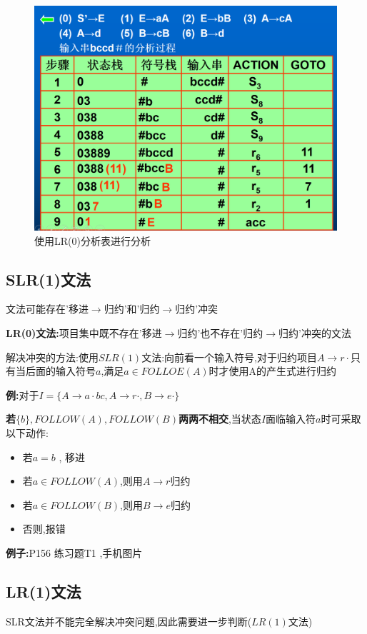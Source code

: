 \documentclass[UTF8,a4paper]{ctexart}
\newcommand{\spaceline}{\vspace{\baselineskip}}
\begin{document}
 \begin{figure}[H]
  \centering
  \includegraphics[scale = 0.3]{assets/CompilerConstructionPrinciples_a04e8.png}
  \caption{使用LR(0)分析表进行分析}
 \end{figure}

 \subsection{SLR(1)文法}
 文法可能存在'移进$\to$归约'和'归约$\to$归约'冲突

 \textbf{LR(0)文法:}项目集中既不存在'移进$\to$归约'也不存在'归约$\to$归约'冲突的文法

 \spaceline
 解决冲突的方法:使用$SLR(1)$文法:向前看一个输入符号,对于归约项目$A\to r \cdot$只有当后面的输入符号$a$,满足$a \in FOLLOE(A)$时才使用A的产生式进行归约

 \textbf{例:}对于$I = \{A\to a\cdot bc , A\to r \cdot , B\to e\cdot \}$

 \textbf{若$\{b\},FOLLOW(A) , FOLLOW(B)$两两不相交},当状态$I$面临输入符$a$时可采取以下动作:
 \begin{itemize}
  \item 若$a = b$ , 移进
  \item 若$a\in FOLLOW(A)$,则用$A\to r$归约
  \item 若$a\in FOLLOW(B)$,则用$B\to e$归约
  \item 否则,报错
 \end{itemize}

 \spaceline
 \textbf{例子:}P156 练习题T1 ,手机图片

 \subsection{LR(1)文法}
 SLR文法并不能完全解决冲突问题,因此需要进一步判断($LR(1)$文法)
\end{document}
